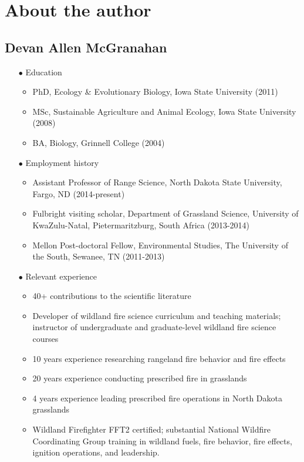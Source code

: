 \section{About the author} 

\subsection*{Devan Allen McGranahan}

\begin{itemize}
	\item[$\bullet$] Education 
	\begin{itemize}
		\item PhD, Ecology \& Evolutionary Biology, Iowa State University (2011)
		\item MSc, Sustainable Agriculture and Animal Ecology, Iowa State University (2008)
		\item BA, Biology, Grinnell College (2004)
	\end{itemize}
	\item[$\bullet$] Employment history 
	\begin{itemize}
		\item Assistant Professor of Range Science, North Dakota State University, Fargo, ND (2014-present)
		\item Fulbright visiting scholar, Department of Grassland Science, University of KwaZulu-Natal, Pietermaritzburg, South Africa (2013-2014)
		\item Mellon Post-doctoral Fellow, Environmental Studies, The University of the South, Sewanee, TN (2011-2013)
	\end{itemize}
	\item[$\bullet$] Relevant experience 
	\begin{itemize} 
		\item 40+ contributions to the scientific literature
		\item Developer of wildland fire science curriculum and teaching materials; instructor of undergraduate and graduate-level wildland fire science courses
		\item 10 years experience researching rangeland fire behavior and fire effects 
		\item 20 years experience conducting prescribed fire in grasslands
		\item 4 years experience leading prescribed fire operations in North Dakota grasslands
		\item Wildland Firefighter FFT2 certified; substantial National Wildfire Coordinating Group training in wildland fuels, fire behavior, fire effects, ignition operations, and leadership. 
	\end{itemize}	
\end{itemize}

